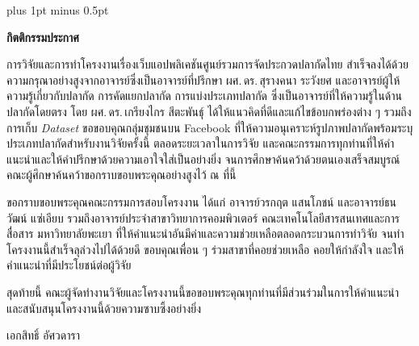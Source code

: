 
\clearpage
{}

\begingroup
\fontsize{16pt}{19.2pt}\selectfont

\justifying
\XeTeXlinebreakskip=0pt plus 1pt minus 0.5pt

\setlength{\parindent}{1.5cm}
\setlength{\parskip}{0pt}

\vspace*{-\topskip}\vspace*{\baselineskip}

{}

\begin{center}
	\textbf{กิตติกรรมประกาศ}
\end{center}

\vspace{\baselineskip}

การวิจัยและการทำโครงงานเรื่องเว็บแอปพลิเคชันศูนย์รวมการจัดประกวดปลากัดไทย
สำเร็จลงได้ด้วยความกรุณาอย่างสูงจากอาจารย์ซึ่งเป็นอาจารย์ที่ปรึกษา
ผศ.\,ดร.\,สุรางคนา ระวังยศ และอาจารย์ผู้ให้ความรู้เกี่ยวกับปลากัด การคัดแยกปลากัด
การแบ่งประเภทปลากัด ซึ่งเป็นอาจารย์ที่ให้ความรู้ในด้านปลากัดโดยตรง
โดย ผศ.\,ดร.\,เกรียงไกร สีตะพันธุ์ ได้ให้แนวคิดที่ดีและแก้ไขข้อบกพร่องต่าง ๆ
รวมถึงการเก็บ \textit{Dataset} ขอขอบคุณกลุ่มชุมชนบน Facebook
ที่ให้ความอนุเคราะห์รูปภาพปลากัดพร้อมระบุประเภทปลากัดสำหรับงานวิจัยครั้งนี้
ตลอดระยะเวลาในการวิจัย และคณะกรรมการทุกท่านที่ให้คำแนะนำและให้คำปรึกษาด้วยความเอาใจใส่เป็นอย่างยิ่ง
จนการศึกษาค้นคว้าด้วยตนเองเสร็จสมบูรณ์ คณะผู้ศึกษาค้นคว้าขอกราบขอบพระคุณอย่างสูงไว้ ณ ที่นี้

\par ขอกราบขอบพระคุณคณะกรรมการสอบโครงงาน ได้แก่ อาจารย์วรกฤต แสนโภชน์
และอาจารย์ธนวัฒน์ แซ่เอียบ รวมถึงอาจารย์ประจำสาขาวิทยาการคอมพิวเตอร์
คณะเทคโนโลยีสารสนเทศและการสื่อสาร มหาวิทยาลัยพะเยา
ที่ให้คำแนะนำอันมีค่าและความช่วยเหลือตลอดกระบวนการทำวิจัย
จนทำโครงงานนี้สำเร็จลุล่วงไปได้ด้วยดี ขอบคุณเพื่อน ๆ ร่วมสาขาที่คอยช่วยเหลือ
คอยให้กำลังใจ และให้คำแนะนำที่มีประโยชน์ต่อผู้วิจัย

\par สุดท้ายนี้ คณะผู้จัดทำงานวิจัยและโครงงานนี้ขอขอบพระคุณทุกท่านที่มีส่วนร่วมในการให้คำแนะนำ
และสนับสนุนโครงงานนี้ด้วยความซาบซึ้งอย่างยิ่ง

\vspace{\baselineskip}
\begin{flushright}
	เอกสิทธิ์ อัศวดารา
\end{flushright}

\par\endgroup
\clearpage

